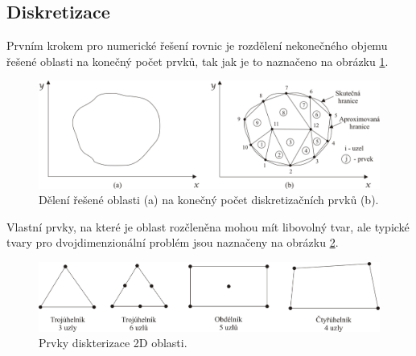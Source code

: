 \subsection*{Diskretizace}
Prvním krokem pro numerické řešení rovnic je rozdělení nekonečného objemu řešené oblasti na konečný počet prvků, tak jak je to naznačeno na obrázku \ref{obr:sim_diskretizace}.
\begin{figure}[!h]
	\centering
	\includegraphics[width=14cm]{sim_diskretizace.png}
	\caption{Dělení řešené oblasti (a) na konečný počet diskretizačních prvků (b). \cite{num}}
	\label{obr:sim_diskretizace}
\end{figure}
Vlastní prvky, na které je oblast rozčleněna mohou mít libovolný tvar, ale typické tvary pro dvojdimenzionální problém jsou naznačeny na obrázku \ref{obr:sim_prvky}.
\begin{figure}[!h]
	\centering
	\includegraphics[width=13cm]{sim_prvky.png}
	\caption{Prvky diskterizace 2D oblasti. \cite{num}}
	\label{obr:sim_prvky}
\end{figure}

